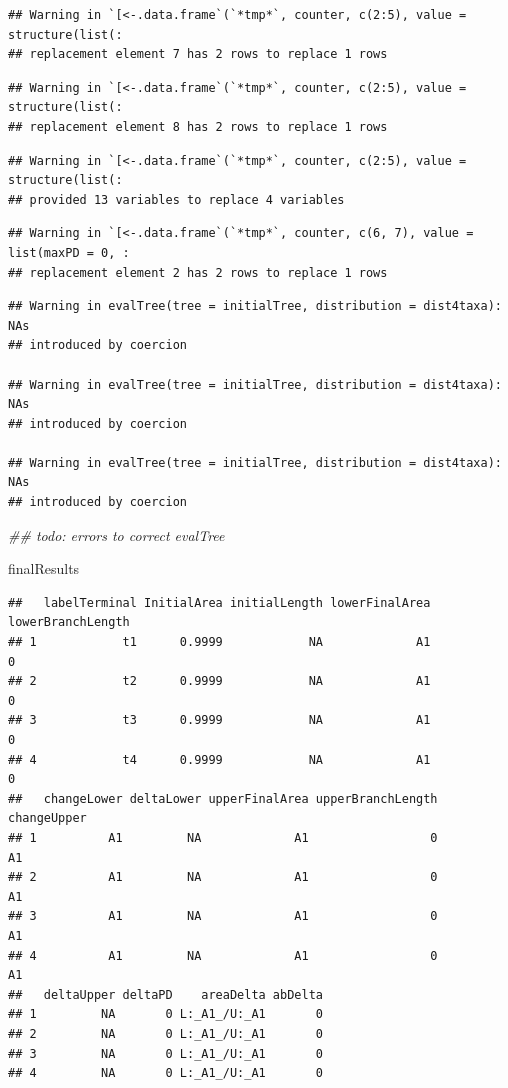 \documentclass[]{article}
\newenvironment{Shaded}{\begin{snugshade}}{\end{snugshade}}
\newcommand{\CommentTok}[1]{\textcolor[rgb]{0.56,0.35,0.01}{\textit{#1}}}
\newcommand{\NormalTok}[1]{#1}
\begin{document}
\begin{verbatim}
## Warning in `[<-.data.frame`(`*tmp*`, counter, c(2:5), value = structure(list(:
## replacement element 7 has 2 rows to replace 1 rows
\end{verbatim}

\begin{verbatim}
## Warning in `[<-.data.frame`(`*tmp*`, counter, c(2:5), value = structure(list(:
## replacement element 8 has 2 rows to replace 1 rows
\end{verbatim}

\begin{verbatim}
## Warning in `[<-.data.frame`(`*tmp*`, counter, c(2:5), value = structure(list(:
## provided 13 variables to replace 4 variables
\end{verbatim}

\begin{verbatim}
## Warning in `[<-.data.frame`(`*tmp*`, counter, c(6, 7), value = list(maxPD = 0, :
## replacement element 2 has 2 rows to replace 1 rows
\end{verbatim}

\begin{verbatim}
## Warning in evalTree(tree = initialTree, distribution = dist4taxa): NAs
## introduced by coercion

## Warning in evalTree(tree = initialTree, distribution = dist4taxa): NAs
## introduced by coercion

## Warning in evalTree(tree = initialTree, distribution = dist4taxa): NAs
## introduced by coercion
\end{verbatim}

\begin{Shaded}
\begin{Highlighting}[]
\CommentTok{## todo: errors to correct evalTree}

\NormalTok{finalResults}
\end{Highlighting}
\end{Shaded}

\begin{verbatim}
##   labelTerminal InitialArea initialLength lowerFinalArea lowerBranchLength
## 1            t1      0.9999            NA             A1                 0
## 2            t2      0.9999            NA             A1                 0
## 3            t3      0.9999            NA             A1                 0
## 4            t4      0.9999            NA             A1                 0
##   changeLower deltaLower upperFinalArea upperBranchLength changeUpper
## 1          A1         NA             A1                 0          A1
## 2          A1         NA             A1                 0          A1
## 3          A1         NA             A1                 0          A1
## 4          A1         NA             A1                 0          A1
##   deltaUpper deltaPD    areaDelta abDelta
## 1         NA       0 L:_A1_/U:_A1       0
## 2         NA       0 L:_A1_/U:_A1       0
## 3         NA       0 L:_A1_/U:_A1       0
## 4         NA       0 L:_A1_/U:_A1       0
\end{verbatim}
\end{document}
